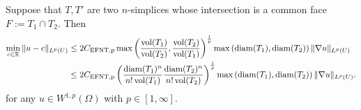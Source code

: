 \documentclass[a4paper]{article}
\begin{document}
\begin{lemma}\label{lemma:poincarefriedrichsoverfacepatch}
    Suppose that $T, T'$ are two $n$-simplices whose intersection is a common face $F := T_1 \cap T_2$. Then 
    \begin{align*}
        \min\limits_{ c \in {\mathbb R} }
        \| u - c \|_{L^{p}(U)}
        &
        \leq 
        2 C_{\rm{EFNT},p}
        \max\left( 
            \frac{ \operatorname{vol}(T_1) }{ \operatorname{vol}(T_2) }
            ,
            \frac{ \operatorname{vol}(T_2) }{ \operatorname{vol}(T_1) }
        \right)^{\frac 1 p}
        \max\left( {\operatorname{diam}}(T_1), {\operatorname{diam}}(T_2) \right)
        \| \nabla u \|_{L^{p}(U)}
        \\&
        \leq 
        2 C_{\rm{EFNT},p}
        \left( 
            \frac{{\operatorname{diam}}(T_1)^n}{n! \operatorname{vol}(T_1)} 
            \frac{{\operatorname{diam}}(T_2)^n}{n! \operatorname{vol}(T_2)} 
        \right)^{\frac 1 p}
        \max\left( {\operatorname{diam}}(T_1), {\operatorname{diam}}(T_2) \right)
        \| \nabla u \|_{L^{p}(U)}
        .
    \end{align*}
    for any $u \in W^{1,p}(\Omega)$ with $p \in [1,\infty]$.
\end{lemma}
\end{document}
